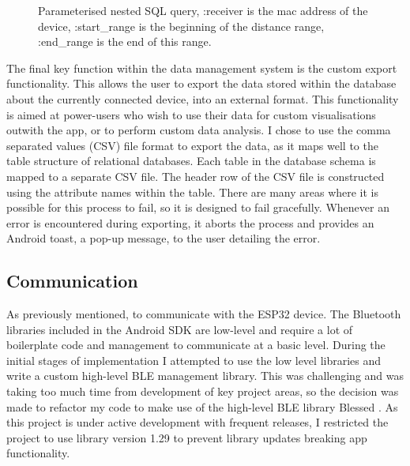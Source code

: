 \documentclass{l4proj}
\begin{document}
\begin{figure}[!htb]
    
    \caption{ Parameterised nested SQL query, :receiver is the mac address of the device, :start\_range is the beginning of the distance range, :end\_range is the end of this range. }
    \label{cde:sql}
\end{figure}

The final key function within the data management system is the custom export functionality. This allows the user to export the data stored within the database about the currently connected device, into an external format. This functionality is aimed at power-users who wish to use their data for custom visualisations outwith the app, or to perform custom data analysis. I chose to use the comma separated values (CSV) file format to export the data, as it maps well to the table structure of relational databases. Each table in the database schema is mapped to a separate CSV file. The header row of the CSV file is constructed using the attribute names within the table. There are many areas where it is possible for this process to fail, so it is designed to fail gracefully. Whenever an error is encountered during exporting, it aborts the process and provides an Android toast, a pop-up message, to the user detailing the error.

\subsection{Communication}

As previously mentioned, to communicate with the ESP32 device. The Bluetooth libraries included in the Android SDK are low-level and require a lot of boilerplate code and management to communicate at a basic level. During the initial stages of implementation I attempted to use the low level libraries and write a custom high-level BLE management library. This was challenging and was taking too much time from development of key project areas, so the decision was made to refactor my code to make use of the high-level BLE library Blessed \citep{welie_weliemblessed-android_2021}. As this project is under active development with frequent releases, I restricted the project to use library version 1.29 to prevent library updates breaking app functionality.
\end{document}
